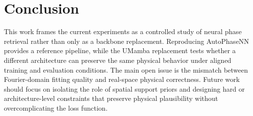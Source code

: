 \section{Conclusion}

This work frames the current experiments as a controlled study of neural phase
retrieval rather than only as a backbone replacement. Reproducing AutoPhaseNN
provides a reference pipeline, while the UMamba replacement tests whether a
different architecture can preserve the same physical behavior under aligned
training and evaluation conditions. The main open issue is the mismatch between
Fourier-domain fitting quality and real-space physical correctness. Future work
should focus on isolating the role of spatial support priors and designing hard
or architecture-level constraints that preserve physical plausibility without
overcomplicating the loss function.
